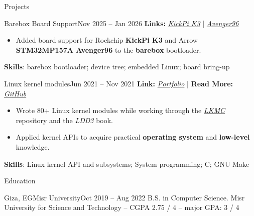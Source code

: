 \documentclass[]{Sohaib-Mohamed}
\begin{document}
\begin{cvsection}{Projects}

   \begin{cvsubsection}{Barebox Board Support}{}{Nov 2025 -- Jan 2026}
      \textbf{Links:} \href{https://lore.barebox.org/barebox/20260116-barebox-kickpi-v1-0-d11fbccd527a@gmail.com/T/}{\textit{KickPi K3}} | \href{https://lore.barebox.org/barebox/20251203-avenger96-v2-0-95f0cfa50aaa@gmail.com/}{\textit{Avenger96}}
      \begin{itemize}
         \item Added board support for Rockchip \textbf{KickPi K3} and Arrow \textbf{STM32MP157A Avenger96} to the \textbf{barebox} bootloader.
      \end{itemize}
      \textbf{Skills}: barebox bootloader; device tree; embedded Linux; board bring-up
   \end{cvsubsection}

   \begin{cvsubsection}{Linux kernel modules}{}{Jun 2021 -- Nov 2021}
      \textbf{Link:} \href{https://gist.github.com/smalinux/2e9c5537fdac65501a655280352c9c15#linux-kernel-modules}{\textit{Portfolio}} | \textbf{Read More:} \href{https://github.com/smalinux/linux-kernel-modules-lab}{\textit{GitHub}}
      \begin{itemize}
         \item Wrote 80+ Linux kernel modules while working through the \href{https://github.com/cirosantilli/linux-kernel-module-cheat}{\textit{LKMC}} repository and the \textit{LDD3} book.
         \item Applied kernel APIs to acquire practical \textbf{operating system} and \textbf{low-level} knowledge.
      \end{itemize}
      \textbf{Skills}: Linux kernel API and subsystems; System programming; C; GNU Make
   \end{cvsubsection}

\end{cvsection}


\begin{cvsection}{Education}
   \begin{cvsubsection}{Giza, EG}{Misr University}{Oct 2019 -- Aug 2022}
      B.S. in Computer Science. Misr University for Science and Technology -- CGPA 2.75 / 4 -- major GPA: 3 / 4
   \end{cvsubsection}
\end{cvsection}
\end{document}
